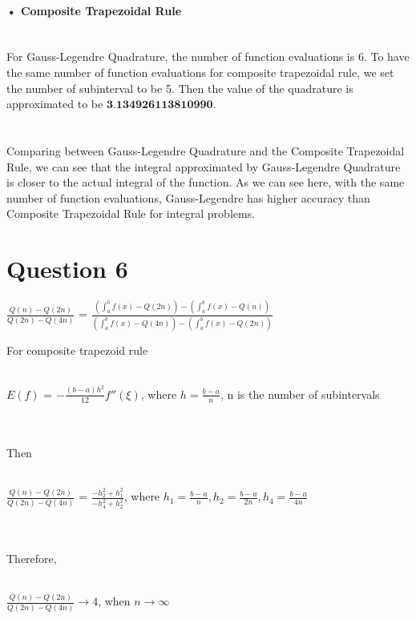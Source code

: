 \documentclass[11pt]{article} %
\begin{document}
\paragraph{• Composite Trapezoidal Rule}\mbox{}\\
For Gauss-Legendre Quadrature, the number of function evaluations is 6. To have the same number of function evaluations for composite trapezoidal rule, we set the number of subinterval to be 5. Then the value of the quadrature is approximated to be $\textbf{3.134926113810990}$.\\\\\\
Comparing between Gauss-Legendre Quadrature and the Composite Trapezoidal Rule, we can see that the integral approximated by Gauss-Legendre Quadrature is closer to the actual integral of the function. As we can see here, with the same number of function evaluations, Gauss-Legendre has higher accuracy than Composite Trapezoidal Rule for integral problems.
\section{Question 6}
\centerline{$\frac{Q(n)-Q(2n)}{Q(2n)-Q(4n)}$ = $\frac{(\int_{a}^{b}f(x)-Q(2n))-(\int_{a}^{b}f(x)-Q(n))}{(\int_{a}^{b}f(x)-Q(4n))-(\int_{a}^{b}f(x)-Q(2n))}$}\bigskip
For composite trapezoid rule\\\\
\centerline{$E(f)$ = $-\frac{(b-a)h^{2}}{12}f''(\xi)$, where $h = \frac{b-a}{n}$, n is the number of subintervals}\\\\
Then\\\\
\centerline{$\frac{Q(n)-Q(2n)}{Q(2n)-Q(4n)}$ = $\frac{-h_{2}^{2}+h_{1}^{2}}{-h_{4}^{2}+h_{2}^{2}}$, where $h_1=\frac{b-a}{n}, h_2=\frac{b-a}{2n}, h_4=\frac{b-a}{4n}$}\\\\
Therefore,\\\\
\centerline{$\frac{Q(n)-Q(2n)}{Q(2n)-Q(4n)} \to 4$, when $n \to \infty$}
\end{document}
